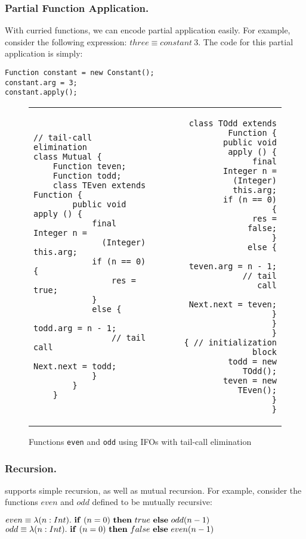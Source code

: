 \subsubsection{Partial Function Application.} With curried functions, we can encode partial application easily.
For example, consider the following
expression:
\vspace{5pt}
$three \equiv constant~3$.
\vspace{5pt}
\noindent The code for this partial application is simply:
\begin{lstlisting}
Function constant = new Constant();
constant.arg = 3;
constant.apply();
\end{lstlisting}
\begin{figure}[t!]
\begin{tabular}[t]{l r}
\begin{lstlisting}
// tail-call elimination
class Mutual {
	Function teven;
	Function todd;
	class TEven extends Function {
		public void apply () {
			final Integer n =
			  (Integer) this.arg;
			if (n == 0) {
				res = true;
			}
			else {
				todd.arg = n - 1;
				// tail call
				Next.next = todd;
			}
		}
	}
\end{lstlisting}&
\hspace{20pt}\begin{lstlisting}
	class TOdd extends Function {
		public void apply () {
			final Integer n =
			  (Integer) this.arg;
			if (n == 0) {
				res = false;
			}
			else {
				teven.arg = n - 1;
				// tail call
				Next.next = teven;
			}
		}
	}
	{ // initialization block
		todd = new TOdd();
		teven = new TEven();
	}
}
\end{lstlisting}
\end{tabular}

\caption{Functions \lstinline{even} and \lstinline{odd} using IFOs with
  tail-call elimination}

\label{fig:even}

\end{figure}
\subsubsection{Recursion.} \name supports simple recursion, as well as
mutual recursion. For example, consider the functions $even$ and $odd$
defined to be mutually recursive:

\vspace{5pt}
\noindent$even \equiv \lambda (n : Int).~{\bf if}~(n=0)~{\bf then}~true~{\bf  else}~odd(n-1)$ \\
\noindent$odd \equiv \lambda (n : Int).~{\bf if}~(n=0)~{\bf then}~false~{\bf else}~even(n-1)$
\vspace{5pt}

